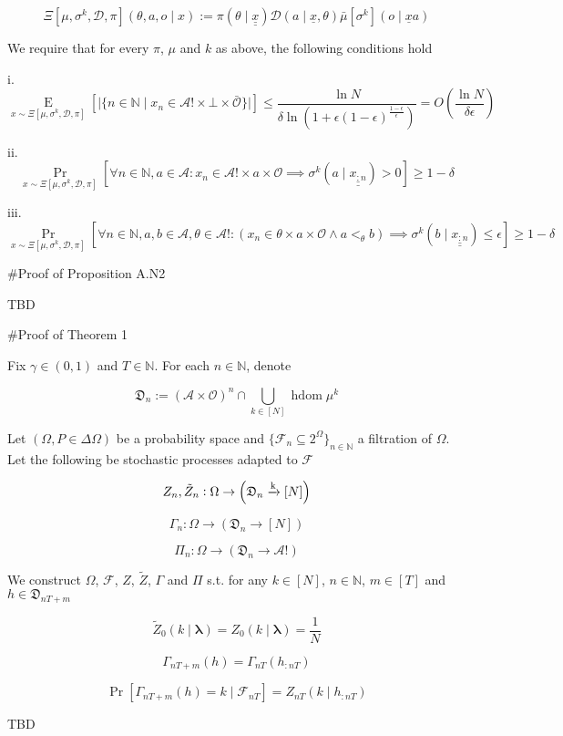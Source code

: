 \documentclass[a4paper]{article}
\newcommand{\E}[1]{\underset{#1}{\operatorname{E}}}
\newcommand{\Nats}{\mathbb{N}}
\newcommand{\Sq}[2]{\{#1\}_{#2 \in \Nats}}
\newcommand{\Sqn}[1]{\Sq{#1}{n}}
\newcommand{\Estr}{\boldsymbol{\lambda}}
\newcommand{\Abs}[1]{\lvert #1 \rvert}
\newcommand{\M}{\xrightarrow{\textnormal{k}}}
\newcommand{\Ob}{\mathcal{O}}
\newcommand{\A}{\mathcal{A}}
\DeclareMathOperator{\HD}{hdom}
\newcommand{\D}{\mathcal{D}}
\newcommand{\Do}{\mathfrak{D}}
\newcommand{\F}{\mathcal{F}}
\begin{document}
$$\Xi\left[\mu,\sigma^k,\D,\pi\right]\left(\theta,a,o \mid x\right):=\pi\left(\theta \mid \underline{\underline{x}}\right)\D\left(a \mid \underline{x},\theta\right) \bar{\mu}[\sigma^k]\left(o \mid \underline{x}a\right)$$

We require that for every $\pi$, $\mu$ and $k$ as above, the following conditions hold

i. $$\E{x \sim\Xi\left[\mu,\sigma^k,\D,\pi\right]}\left[\Abs{\{n \in \Nats \mid x_n \in \A! \times \bot \times \bar{\Ob}\}}\right] \leq \frac{\ln N}{\delta \ln\left(1 + \epsilon(1-\epsilon)^{\frac{1-\epsilon}{\epsilon}}\right)}=O\left(\frac{\ln N}{\delta \epsilon}\right)$$

ii. $$\Pr_{x \sim \Xi\left[\mu,\sigma^k,\D,\pi\right]}\left[\forall n \in \Nats, a \in \A: x_n \in \A! \times a \times \Ob \implies \sigma^k\left(a \mid \underline{\underline{x_{:n}}}\right) > 0\right] \geq 1 - \delta$$

iii.  $$\Pr_{x \sim \Xi\left[\mu,\sigma^k,\D,\pi\right]}\left[\forall n \in \Nats, a,b \in \A, \theta \in \A!: \left(x_n \in \theta \times a \times \Ob \land a <_\theta b\right) \implies \sigma^k\left(b \mid \underline{\underline{x_{:n}}}\right) \leq \epsilon\right] \geq 1 - \delta$$

\#Proof of Proposition A.N2

TBD

\#Proof of Theorem 1

Fix $\gamma \in (0,1)$ and $T \in \Nats$. For each $n \in \Nats$, denote 

$$\Do_n:=(\A \times \Ob)^n \cap \bigcup_{k \in [N]} \HD{\mu^k}$$

Let $(\Omega,P \in \Delta\Omega)$ be a probability space and $\Sqn{\F_n \subseteq 2^\Omega}$ a filtration of $\Omega$. Let the following be stochastic processes adapted to $\F$

$$Z_n,\tilde{Z}_n: \Omega \rightarrow \left(\Do_n \M [N]\right)$$

$$\Gamma_n: \Omega \rightarrow \left(\Do_n \rightarrow [N]\right)$$

$$\Pi_n: \Omega \rightarrow \left(\Do_n \rightarrow \A!\right)$$

We construct $\Omega$, $\F$, $Z$, $\tilde{Z}$, $\Gamma$ and $\Pi$ s.t. for any $k \in [N]$, $n \in \Nats$, $m \in [T]$ and $h \in \Do_{nT+m}$

$$\tilde{Z}_0(k \mid \Estr)=Z_0(k \mid \Estr)=\frac{1}{N}$$

$$\Gamma_{nT+m}\left(h\right)=\Gamma_{nT}\left(h_{:nT}\right)$$

$$\Pr\left[\Gamma_{nT+m}(h)=k \mid \F_{nT}\right] = Z_{nT}\left(k \mid h_{:nT}\right)$$

TBD
\end{document}
